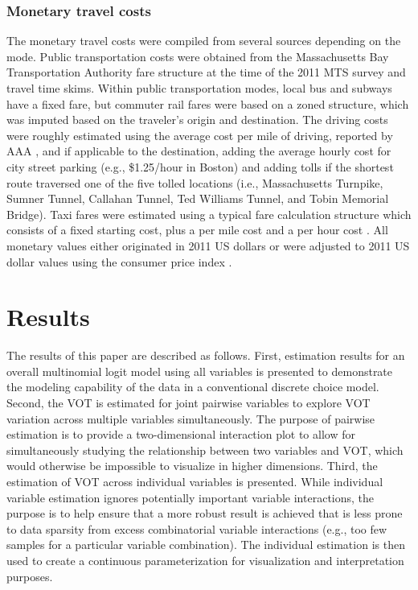 \documentclass[numbered]{trbunofficial}\usepackage[]{graphicx}\usepackage[]{color}
\begin{document}
\subsubsection{Monetary travel costs}
The monetary travel costs were compiled from several sources depending on the mode. Public transportation costs were obtained from the Massachusetts Bay Transportation Authority fare structure at the time of the 2011 MTS survey and travel time skims. Within public transportation modes, local bus and subways have a fixed fare, but commuter rail fares were based on a zoned structure, which was imputed based on the traveler's origin and destination. The driving costs were roughly estimated using the average cost per mile of driving, reported by AAA \citep{AAA2018}, and if applicable to the destination, adding the average hourly cost for city street parking (e.g., \$1.25/hour in Boston) and adding tolls if the shortest route traversed one of the five tolled locations (i.e., Massachusetts Turnpike, Sumner Tunnel, Callahan Tunnel, Ted Williams Tunnel, and Tobin Memorial Bridge). Taxi fares were estimated using a typical fare calculation structure which consists of a fixed starting cost, plus a per mile cost and a per hour cost \citep{NUMBEO2019}. All monetary values either originated in 2011 US dollars or were adjusted to 2011 US dollar values using the consumer price index \citep{BLS2019}.


\section{Results}\label{sec:results}
The results of this paper are described as follows. First, estimation results for an overall multinomial logit model using all variables is presented to demonstrate the modeling capability of the data in a conventional discrete choice model. Second, the VOT is estimated for joint pairwise variables to explore VOT variation across multiple variables simultaneously. The purpose of pairwise estimation is to provide a two-dimensional interaction plot to allow for simultaneously studying the relationship between two variables and VOT, which would otherwise be impossible to visualize in higher dimensions. Third, the estimation of VOT across individual variables is presented. While individual variable estimation ignores potentially important variable interactions, the purpose is to help ensure that a more robust result is achieved that is less prone to data sparsity from excess combinatorial variable interactions (e.g., too few samples for a particular variable combination). The individual estimation is then used to create a continuous parameterization for visualization and interpretation purposes.
\end{document}

